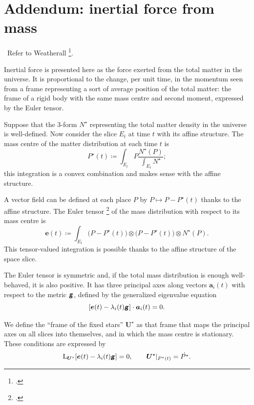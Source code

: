 \documentclass[\ifafour a4paper,12pt,\else a5paper,10pt,\fi%
onecolumn,oneside,article,%
british%
]{memoir}
\theoremstyle{remark}
\theoremstyle{innote}
\newcommand*{\mathte}[1]{\textbf{\textit{\textsf{#1}}}}
\newcommand*{\citep}{\footcites}
\newcommand*{\citey}{\footcites}%
\newcommand*{\defd}{\coloneqq}
\renewcommand*{\|}[1][]{\nonscript\,#1\vert\nonscript\;\mathopen{}}
\newcommand*{\sect}{\S}%
\newcommand*{\puzzle}{{\fontencoding{U}\fontfamily{fontawesometwo}\selectfont\symbol{225}}}
\newcommand{\mynote}[1]{ {\color{notecolour}\puzzle\ #1}}
\newcommand*{\Li}{\mathrm{L}}
\newcommand*{\yd}{N}
\newcommand*{\yrfs}{\yd^{\mathord{\star}}}
\newcommand*{\yP}{P}
\newcommand*{\yPc}{\yP^{\mathord{\star}}}
\newcommand*{\yEu}{E}
\newcommand*{\yeu}{\bm{e}}
\newcommand*{\yva}{\bm{a}}
\newcommand*{\yla}{\lambda}
\newcommand*{\yFF}{U}
\newcommand*{\yF}{\bm{\yFF}}
\newcommand*{\yFi}{\yF^{\mathord{\star}}}
\newcommand*{\ycfs}{\yFi}
\newcommand*{\ygg}{g}
\newcommand*{\yg}{\mathte{\ygg}}
\begin{document}
\appendix



\section{Addendum: inertial force from mass}
\label{sec:inertial_force}

\mynote{Refer to Weatherall \citey{weatherall2017}.}

Inertial force is presented here as the force exerted from the total matter
in the universe. It is proportional to the change, per unit time, in the
momentum seen from a frame representing a sort of average position of the
total matter: the frame of a rigid body with the same mass centre and
second moment, expressed by the Euler tensor.


Suppose that the  3-form $\yrfs$ representing the total matter density in the
universe is well-defined. Now consider the slice $\yEu_t$ at time $t$ with its
affine structure. The mass centre of the matter distribution at each time $t$ is
\begin{equation}
  \label{eq:mass_centre}
  \yPc(t) \defd \int_{\yEu_t} \yP \frac{\yrfs(\yP)}{\int_{\yEu_t}\yrfs};
\end{equation}
this integration is a convex combination and makes sense with the affine
structure. %

A vector field can be defined at each place $\yP$ by
$\yP\mapsto \yP-\yPc(t)$ thanks to the affine structure. The Euler tensor
\citep[\sect~I.10]{truesdell1977_r1991} of the mass distribution with
respect to its mass centre is
\begin{equation}
  \label{eq:euler_univ}
  \yeu(t) \defd \int_{\yEu_t}
  \bigl(\yP -\yPc(t)\bigr)\otimes \bigl(\yP-\yPc(t)\bigr)
  \otimes \yrfs(\yP).
\end{equation}
This tensor-valued integration is possible thanks to the affine structure
of the space slice.

The Euler tensor is symmetric and, if the total mass distribution is enough
well-behaved, it is also positive. It has three principal axes along
vectors $\yva_i(t)$ with respect to the metric $\yg$, defined by the
generalized eigenvalue equation
\begin{equation}
  \label{eq:principal_axes_euler}
  [\yeu(t) - \yla_i(t) \yg] \cdot \yva_i(t) = 0.
\end{equation}

We define the \enquote{frame of the fixed stars} $\yFi$ as that frame that maps
the principal axes on all slices into themselves, and in which the mass
centre is stationary. These conditions are expressed by
\begin{equation}
  \label{eq:defin_fixed-star_frame}
  \Li_{\yFi}[\yeu(t) - \yla_i(t) \yg]=0,\qquad
  \yFi\rvert_{\yPc(t)}=\Dot{\yPc}.
\end{equation}
\end{document}
